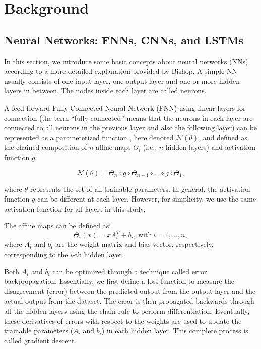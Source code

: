 \chapter{Background}\label{chap:background}


\section{Neural Networks: FNNs, CNNs, and LSTMs}

In this section, we introduce some basic concepts about neural networks (NNs) according to a more detailed explanation provided by Bishop. \citep{10.1117_1.2819119} A simple NN usually consists of one input layer, one output layer and one or more hidden layers in between. The nodes inside each layer are called neurons. 

A feed-forward Fully Connected Neural Network (FNN) using linear layers for connection (the term ``fully connected'' means that the neurons in each layer are connected to all neurons in the previous layer and also the following layer) can be represented as a parameterized function \citep{2306.06304}, here denoted $\mathcal{N}(\theta)$, and defined as the chained composition of $n$ affine maps $\Theta_i$ (i.e., $n$ hidden layers) and activation function $g$:

\begin{equation*}
\mathcal{N}(\theta) = \Theta_n \circ g \circ \Theta_{n-1} \circ \ldots \circ g \circ \Theta_1,
\end{equation*}

where $\theta$ represents the set of all trainable parameters. In general, the activation function $g$ can be
different at each layer. However, for simplicity, we use the same activation function for all layers in this study.

The affine maps can be defined as:
\begin{equation*} 
\Theta_i(x) = xA_i^{T} + b_i, \ \mathrm{with} \ i=1,\ldots,n, 
\end{equation*}
where $A_i$ and $b_i$ are the weight matrix and bias vector, respectively, corresponding to the $i$-th hidden layer.

Both $A_i$ and $b_i$ can be optimized through a technique called error backpropagation. Essentially, we first define a loss function to measure the disagreement (error) between the predicted output from the output layer and the actual output from the dataset. The error is then propagated backwards through all the hidden layers using the chain rule to perform differentiation. Eventually, these derivatives of errors with respect to the weights are used to update the trainable parameters ($A_i$ and $b_i$) in each hidden layer. This complete process is called gradient descent. 


